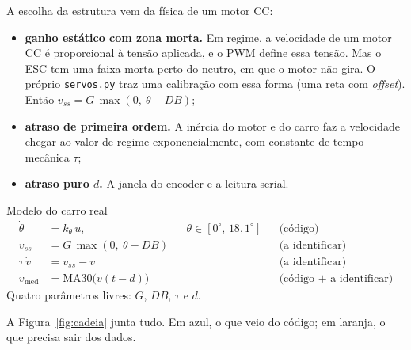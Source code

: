 \documentclass[11pt,a4paper,oneside,openany]{book}
\newcommand{\code}[1]{\texttt{#1}}
\newcommand{\vmed}{v_{\text{med}}}
\begin{document}
A escolha da estrutura vem da física de um motor CC:
\begin{itemize}\itemsep0pt
  \item \textbf{ganho estático com zona morta.} Em regime, a velocidade de um motor CC é
    proporcional à tensão aplicada, e o PWM define essa tensão. Mas o ESC tem uma faixa
    morta perto do neutro, em que o motor não gira. O próprio \code{servos.py} traz uma
    calibração com essa forma (uma reta com \emph{offset}). Então
    $v_{ss} = G\,\max(0,\ \theta - DB)$;
  \item \textbf{atraso de primeira ordem.} A inércia do motor e do carro faz a velocidade
    chegar ao valor de regime exponencialmente, com constante de tempo mecânica $\tau$;
  \item \textbf{atraso puro $d$.} A janela do encoder e a leitura serial.
\end{itemize}

\begin{caixa}{Modelo do carro real}
\vspace{-2mm}
\begin{align}
  \dot\theta &= k_\theta\,u, && \theta\in[0^\circ,\,18{,}1^\circ] && \text{(código)}\nonumber\\
  v_{ss} &= G\,\max(0,\ \theta - DB) && && \text{(a identificar)}\nonumber\\
  \tau\,\dot v &= v_{ss} - v && && \text{(a identificar)}\label{eq:modelo-real}\\
  \vmed &= \mathrm{MA30}\big(v(t-d)\big) && && \text{(código + a identificar)}\nonumber
\end{align}
Quatro parâmetros livres: $G$, $DB$, $\tau$ e $d$.
\end{caixa}

A Figura~\ref{fig:cadeia} junta tudo. Em azul, o que veio do código; em laranja, o que
precisa sair dos dados.
\end{document}
